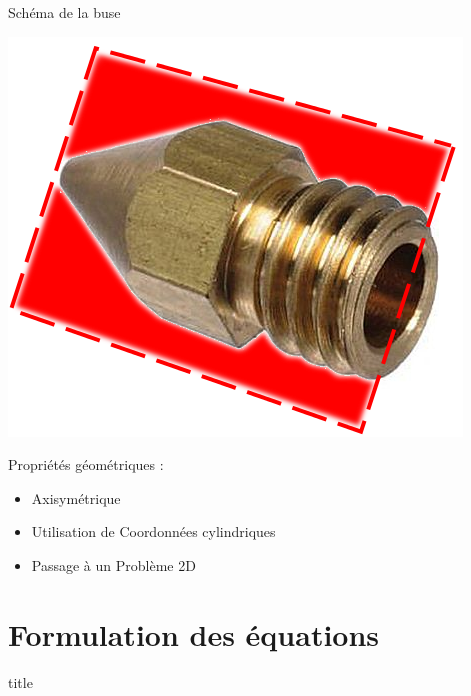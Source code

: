 \documentclass[french]{beamer}
\begin{document}
\begin{frame}{Schéma de la buse}
  \begin{minipage}{0.48\textwidth}
    \includegraphics[scale=0.3]{images/buseCoupe.png}
  \end{minipage}
  \begin{minipage}{0.48\textwidth}
    Propriétés géométriques :
    \begin{itemize}
      \item Axisymétrique
      \item Utilisation de Coordonnées cylindriques
      \item Passage à un Problème 2D
    \end{itemize}
  \end{minipage}
\end{frame}



\section{Formulation des équations}
\begin{frame}
  \vfill
  \centering
  \begin{beamercolorbox}[sep=8pt,center,shadow=true,rounded=true]{title}
    \insertsectionhead
  \end{beamercolorbox}
  \vfill
\end{frame}
\end{document}
